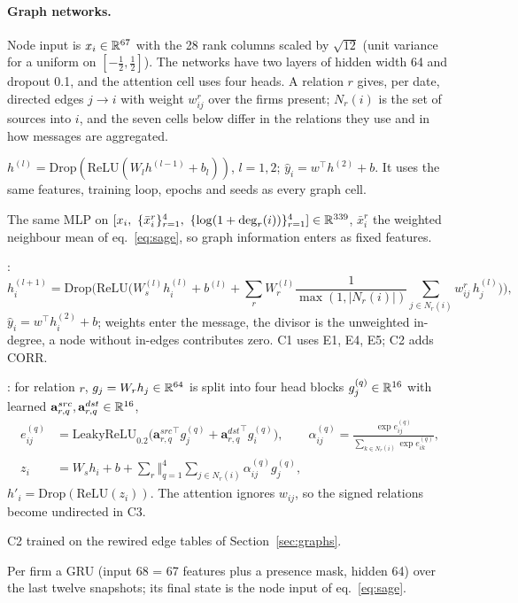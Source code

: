 \paragraph{Graph networks.}
Node input is $x_i\in\mathbb{R}^{67}$ with the 28 rank columns scaled by $\sqrt{12}$ (unit variance for a uniform on $[-\frac12,\frac12]$). The networks have two layers of hidden width 64 and dropout 0.1, and the attention cell uses four heads. A relation $r$ gives, per date, directed edges $j\to i$ with weight $w^r_{ij}$ over the firms present; $N_r(i)$ is the set of sources into $i$, and the seven cells below differ in the relations they use and in how messages are aggregated.
\begin{description}[style=nextline,leftmargin=1.5em]
\item[C0, MLP (baseline).] $h^{(l)}=\mathrm{Drop}(\mathrm{ReLU}(W_lh^{(l-1)}+b_l))$, $l=1,2$; $\hat y_i=w^\top h^{(2)}+b$. It uses the same features, training loop, epochs and seeds as every graph cell.
\item[C0g, aggregates.] The same MLP on $[x_i,\ \{\bar x^r_i\}_{r=1}^4,\ \{\log(1+\deg_r(i))\}_{r=1}^4]\in\mathbb{R}^{339}$, $\bar x^r_i$ the weighted neighbour mean of eq.~\eqref{eq:sage}, so graph information enters as fixed features.
\item[C1, C2, relational GraphSAGE-mean] \citep{hamilton2017,schlichtkrull2018}:
\begin{equation}\label{eq:sage}
h_i^{(l+1)}=\mathrm{Drop}\Big(\mathrm{ReLU}\Big(W_s^{(l)}h_i^{(l)}+b^{(l)}+\sum_r W_r^{(l)}\frac1{\max(1,|N_r(i)|)}\sum_{j\in N_r(i)}w^r_{ij}\,h^{(l)}_j\Big)\Big),
\end{equation}
$\hat y_i=w^\top h_i^{(2)}+b$; weights enter the message, the divisor is the unweighted in-degree, a node without in-edges contributes zero. C1 uses E1, E4, E5; C2 adds CORR.
\item[C3, relational graph attention] \citep{velickovic2018}: for relation $r$, $g_j=W_rh_j\in\mathbb{R}^{64}$ is split into four head blocks $g^{(q)}_j\in\mathbb{R}^{16}$ with learned $\mathbf a^{src}_{r,q},\mathbf a^{dst}_{r,q}\in\mathbb{R}^{16}$,
\begin{equation}\label{eq:gat}
\begin{aligned}
e^{(q)}_{ij}&=\mathrm{LeakyReLU}_{0.2}\big({\mathbf a^{src}_{r,q}}^{\!\top} g^{(q)}_j+{\mathbf a^{dst}_{r,q}}^{\!\top} g^{(q)}_i\big),\qquad
\alpha^{(q)}_{ij}=\frac{\exp e^{(q)}_{ij}}{\sum_{k\in N_r(i)}\exp e^{(q)}_{ik}},\\
z_i&=W_sh_i+b+\sum_r\big\Vert_{q=1}^{4}\sum_{j\in N_r(i)}\alpha^{(q)}_{ij}g^{(q)}_j,
\end{aligned}
\end{equation}
$h'_i=\mathrm{Drop}(\mathrm{ReLU}(z_i))$. The attention ignores $w_{ij}$, so the signed relations become undirected in C3.
\item[C4, rewired null.] C2 trained on the rewired edge tables of Section~\ref{sec:graphs}.
\item[C5, temporal.] Per firm a GRU \citep{cho2014} (input 68 = 67 features plus a presence mask, hidden 64) over the last twelve snapshots; its final state is the node input of eq.~\eqref{eq:sage}.
\end{description}
